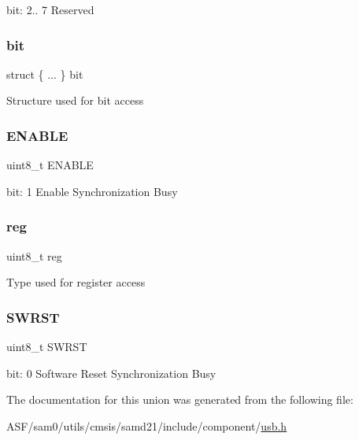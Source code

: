 bit\+: 2.. 7 Reserved \mbox{\label{union_u_s_b___s_y_n_c_b_u_s_y___type_afbffe4d6f9c0d71c23faf9e6be64d207}} 
\subsubsection{\texorpdfstring{bit}{bit}}
{\footnotesize\ttfamily struct \{ ... \}   bit}

Structure used for bit access \mbox{\label{union_u_s_b___s_y_n_c_b_u_s_y___type_a2b3662f1b123463ae1a23c1f324e5cc5}} 
\subsubsection{\texorpdfstring{ENABLE}{ENABLE}}
{\footnotesize\ttfamily uint8\+\_\+t E\+N\+A\+B\+LE}

bit\+: 1 Enable Synchronization Busy \mbox{\label{union_u_s_b___s_y_n_c_b_u_s_y___type_a9428adc9af4653a2050e2536b55dec8d}} 
\subsubsection{\texorpdfstring{reg}{reg}}
{\footnotesize\ttfamily uint8\+\_\+t reg}

Type used for register access \mbox{\label{union_u_s_b___s_y_n_c_b_u_s_y___type_a9334d5ac0548802c90a8129c52c8e490}} 
\subsubsection{\texorpdfstring{SWRST}{SWRST}}
{\footnotesize\ttfamily uint8\+\_\+t S\+W\+R\+ST}

bit\+: 0 Software Reset Synchronization Busy 

The documentation for this union was generated from the following file\+:\begin{DoxyCompactItemize}
\item 
A\+S\+F/sam0/utils/cmsis/samd21/include/component/\mbox{\hyperlink{component_2usb_8h}{usb.\+h}}\end{DoxyCompactItemize}
